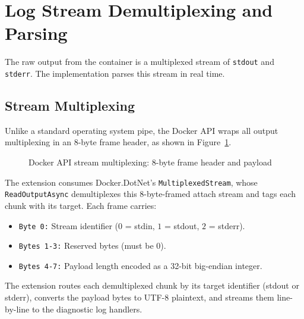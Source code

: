 \section{Log Stream Demultiplexing and Parsing}
The raw output from the container is a multiplexed stream of \texttt{stdout} and \texttt{stderr}. The implementation parses this stream in real time.

\subsection{Stream Multiplexing}
Unlike a standard operating system pipe, the Docker API wraps all output multiplexing in an 8-byte frame header, as shown in Figure~\ref{fig:docker_header}.

\begin{figure}[H]
    \centering
    \caption[Docker Stream Multiplexing Frame]{Docker API stream multiplexing: 8-byte frame header and payload}
    \label{fig:docker_header}
\end{figure}

The extension consumes Docker.DotNet's \texttt{MultiplexedStream}, whose \texttt{ReadOutputAsync} demultiplexes this 8-byte-framed attach stream and tags each chunk with its target. Each frame carries:
\begin{itemize}
    \item \texttt{Byte 0:} Stream identifier ($0$ = stdin, $1$ = stdout, $2$ = stderr).
    \item \texttt{Bytes 1-3:} Reserved bytes (must be $0$).
    \item \texttt{Bytes 4-7:} Payload length encoded as a 32-bit big-endian integer.
\end{itemize}
The extension routes each demultiplexed chunk by its target identifier (stdout or stderr), converts the payload bytes to UTF-8 plaintext, and streams them line-by-line to the diagnostic log handlers.

